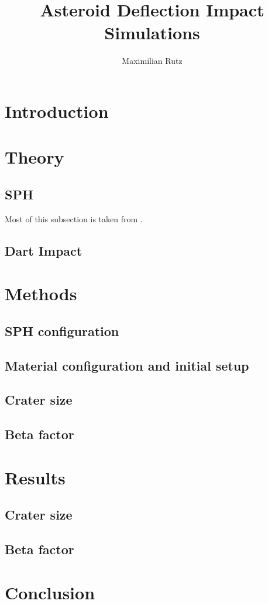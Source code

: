 \documentclass{article}
\title{Asteroid Deflection Impact Simulations}
\author{Maximilian Rutz}
\date{}
\begin{document}
	\maketitle
	\begin{abstract}
	 
	\end{abstract}
	
	\newpage
	\tableofcontents
	 
	\newpage
	\section{Introduction} 
	\section{Theory}
		\subsection{SPH}
			Most of this subsection is taken from \cite{Jutzi_p_alpha_1}.	
		\subsection{Dart Impact}
	\section{Methods}
		\subsection{SPH configuration}
		\subsection{Material configuration and initial setup}
		\subsection{Crater size}
		\subsection{Beta factor}

	\section{Results}
		\subsection{Crater size}
		\subsection{Beta factor}
	\section{Conclusion}
	
	\newpage 
	\printbibliography
 
\end{document}
